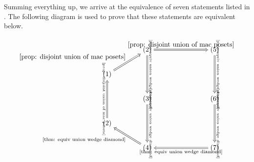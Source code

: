 \documentclass[11pt, reqno]{amsart}
\renewcommand{\P}{{\mathcal P}}
\theoremstyle{plain} %
\newtheorem{cor}[thm]{Corollary}
\theoremstyle{definition}
\theoremstyle{remark}
\numberwithin{equation}{section}  %
\begin{document}

Summing everything up, we arrive at the equivalence of seven statements listed in . The following diagram is used to prove that these statements are equivalent below.

\[\begin{tikzcd}[cramped, row sep=2em, column sep=4em]
        & (2) && (5) \\
	(1) \\
	& (3) && (6) \\
        (2) \\
	& (4) && (7) 
	\arrow[Rightarrow,"{\Cref{prop: disjoint union of mac posets}}", from=2-1, to=1-2]
    \arrow[Rightarrow,"\rotatebox{270}{\tiny \Cref{prop:equiv union wedge diamond}}", from=1-2, to=3-2]
	\arrow[Rightarrow, "\rotatebox{270}{\tiny \Cref{prop: disjoint union of mac posets}}", from=4-1, to=2-1]
	\arrow[Rightarrow, "{\Cref{prop: disjoint union of mac posets}}", from=1-2, to=1-4]
	\arrow[Rightarrow,"{\rotatebox{270}{\tiny \Cref{prop:equiv union wedge diamond}}}", from=3-2, to=5-2]
	\arrow[Rightarrow, "{\rotatebox{270}{\tiny \Cref{prop:equiv union wedge diamond}}}", from=3-4, to=5-4]
	\arrow[Rightarrow, "{\rotatebox{270}{\tiny \Cref{prop:equiv union wedge diamond}}}" ,from=1-4, to=3-4]
        \arrow[Rightarrow, "{\text{\Cref{thm: equiv union wedge diamond}}}" ,from=5-4, to=5-2]
	\arrow[Rightarrow, "{\text{\Cref{thm: equiv union wedge diamond}}}",from=5-2, to=4-1]
\end{tikzcd}\]
\end{document}
